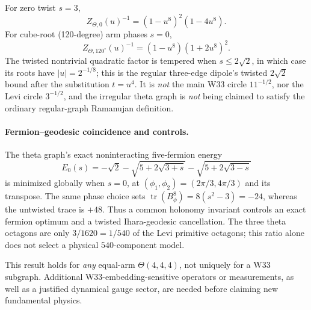 For zero twist \(s=3\),
\[
Z_{\Theta,0}(u)^{-1}=(1-u^8)^2(1-4u^8).
\]
For cube-root (120-degree) arm phases \(s=0\),
\[
\boxed{
Z_{\Theta,120^\circ}(u)^{-1}=
(1-u^8)(1+2u^8)^2.}
\]
The twisted nontrivial quadratic factor is tempered when
\(s\le 2\sqrt2\), in which case its roots have
\(\lvert u\rvert=2^{-1/8}\); this is the regular
three-edge dipole's twisted \(2\sqrt2\) bound after
the substitution \(t=u^4\).  It is \emph{not}
the main W33 circle \(11^{-1/2}\), nor the Levi circle
\(3^{-1/2}\), and the irregular theta graph is
\emph{not} being claimed to satisfy the ordinary
regular-graph Ramanujan definition.

\paragraph{Fermion--geodesic coincidence and controls.}
The theta graph's exact noninteracting five-fermion energy
\[
E_0(s)=-\sqrt2-\sqrt{5+2\sqrt{3+s}}-
                 \sqrt{5+2\sqrt{3-s}}
\]
is minimized globally when \(s=0\), at
\((\phi_1,\phi_2)=(2\pi/3,4\pi/3)\) and its transpose.
The same phase choice sets
\(\operatorname{tr}(B_\phi^8)=8(s^2-3)=-24\),
whereas the untwisted trace is \(+48\).
Thus a common holonomy invariant controls an exact
fermion optimum and a twisted Ihara-geodesic cancellation.
The three theta octagons are only \(3/1620=1/540\)
of the Levi primitive octagons; this ratio alone
does not select a physical \(540\)-component model.

This result holds for \emph{any} equal-arm
\(\Theta(4,4,4)\), not uniquely for a W33 subgraph.
Additional W33-embedding-sensitive operators or measurements,
as well as a justified dynamical gauge sector,
are needed before claiming new fundamental physics.
